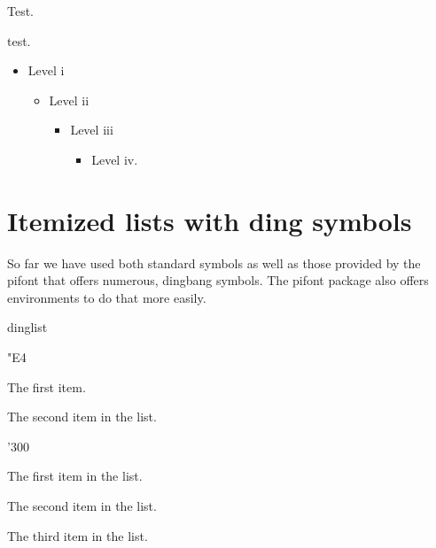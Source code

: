 \begin{reditemize}
\item Test.
   \begin{reditemize}
    \item test.
   \end{reditemize}
\end{reditemize}

\begin{itemize}
\item Level i
      \begin{itemize}
       \item Level ii
          \begin{itemize}
            \item Level iii
              \begin{itemize}
                \item Level iv. \lipsum*[1]
              \end{itemize}
          \end{itemize}
      \end{itemize}
\end{itemize}


\section{Itemized lists with ding symbols}

So far we have used both standard symbols as well as those provided by the pifont that offers numerous,
dingbang symbols. The pifont package also offers environments to do that more easily.


\begin{texexample}{dinglist}{}
\begin{dinglist}{"E4}
\item The first item. \item The second
item in the list.
\end{dinglist}
\end{texexample}

\begin{dingautolist}{'300}
\item The first item in the list.\label{lst:a}
\item The second item in the list.\label{lst:b}
\item The third item in the list.\label{lst:c}
\end{dingautolist}




